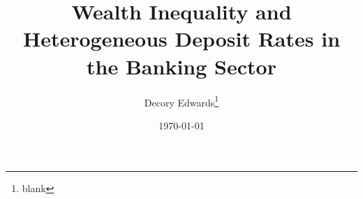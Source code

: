 \documentclass{article}
\title{Wealth Inequality and Heterogeneous Deposit Rates in the Banking Sector}
\author{Decory Edwards\thanks{blank}}
\date{\today}
\begin{document}
\maketitle


\vspace{2em}
\noindent
\begin{abstract}
  \noindent
  
\end{abstract}

\newpage







\clearpage


\printbibliography

\appendix

\end{document}
